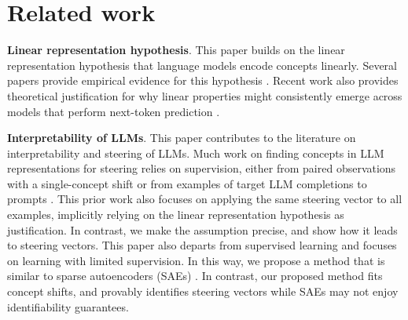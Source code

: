 \documentclass{article}
\begin{document}
\section{Related work}
\label{sec:rel}
\textbf{Linear representation hypothesis}. This paper builds on the linear representation hypothesis that language models encode concepts linearly. Several papers provide empirical evidence for this hypothesis \citep{mikolov-etal-2013-linguistic, gittens-etal-2017-skip, ethayarajh2019understandinglinearwordanalogies, allen2019analogiesexplainedunderstandingword, seonwoo-etal-2019-additive, burns2024discoveringlatentknowledgelanguage, li2024inferencetimeinterventionelicitingtruthful, moschella2023relativerepresentationsenablezeroshot, tigges2023linearrepresentationssentimentlarge, nissim2019fairbettersensationalmandoctor, ravfogel-etal-2020-null,park2023linear, park2024geometrycategoricalhierarchicalconcepts}. Recent work also provides theoretical justification for why linear properties might consistently emerge across models that perform next-token prediction \citep{roeder2021linear, jiang2024originslinearrepresentationslarge, marconato2024all}.  

\textbf{Interpretability of LLMs}. This paper contributes to the literature on interpretability and steering of LLMs. Much work on finding concepts in LLM representations for steering relies on supervision, either from paired observations with a single-concept shift \citep{panickssery2024steeringllama2contrastive,turner2024steeringlanguagemodelsactivation,rimsky2024steering,li2024inferencetimeinterventionelicitingtruthful} or from examples of target LLM completions to prompts \citep{subramani2022extracting}. This prior work also focuses on applying the same steering vector to all examples, implicitly relying on the linear representation hypothesis as justification. In contrast, we make the assumption precise, and show how it leads to steering vectors. This paper also departs from supervised learning and focuses on learning with limited supervision. In this way, we propose a method that is similar to sparse autoencoders (SAEs) \citep{templeton2024scaling, engels2024languagemodelfeatureslinear, cunningham2023sparseautoencodershighlyinterpretable, rajamanoharan2024improvingdictionarylearninggated, gao2024scaling}. In contrast, our proposed method fits concept shifts, and provably identifies steering vectors while SAEs may not enjoy identifiability guarantees.
\end{document}
